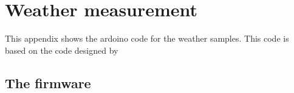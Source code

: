 \chapter{Weather measurement}\label{ap:wet_code}
This appendix shows the ardoino code for the weather samples. This code is based on the code designed by \citep{how_anemometer}


\section*{The firmware}




